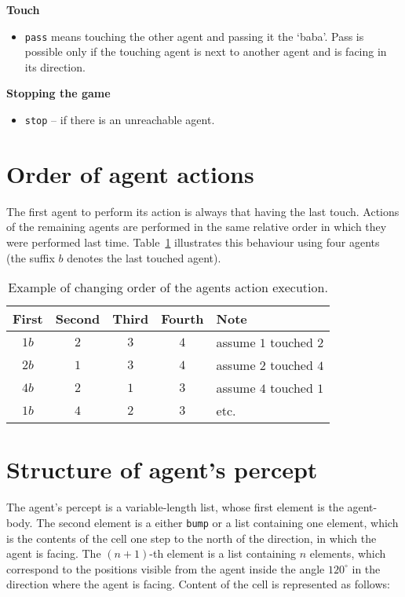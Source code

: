 \documentclass[a4paper,12pt]{article}
\begin{document}
\textbf{Touch}
\begin{itemize}
\item \texttt{pass} means touching the other agent and passing it the `baba'. Pass is possible only if the touching
agent is next to another agent and is facing in its direction.
\end{itemize}

\textbf{Stopping the game}
\begin{itemize}
\item \texttt{stop} -- if there is an unreachable agent.
\end{itemize}

\section*{Order of agent actions}
The first agent to perform its action is always that having the last touch. Actions of the remaining agents are
performed in the same relative order in which they were performed last time. Table~\ref{table:example} illustrates this
behaviour using four agents (the suffix $b$ denotes the last touched agent).
\begin{table}[ht]
\begin{center}
\begin{tabular}{ | c | c | c | c | l | }
 \hline
First & Second & Third & Fourth & Note \\
 \hline
$1b$ & $2$ & $3$ & $4$ & assume $1$ touched $2$ \\
$2b$ & $1$ & $3$ & $4$ & assume $2$ touched $4$ \\
$4b$ & $2$ & $1$ & $3$ & assume $4$ touched $1$ \\
$1b$ & $4$ & $2$ & $3$ & etc. \\
 \hline
\end{tabular}
\end{center}
\caption[Příklad změněného pořadí spouštění akcí agentů.]{Example of changing order of the agents action execution.}
\label{table:example}
\end{table}

\section*{Structure of agent's percept}
The agent's percept is a variable-length list, whose first element is the agent-body. The second element is a either
\texttt{bump} or a list containing one element, which is the contents of the cell one step to the north of the
direction, in which the agent is facing. The $(n+1)$-th element is a list containing $n$ elements, which correspond to
the positions visible from the agent inside the angle $120^\circ$ in the direction where the agent is facing. Content of
the cell is represented as follows:
\end{document}
